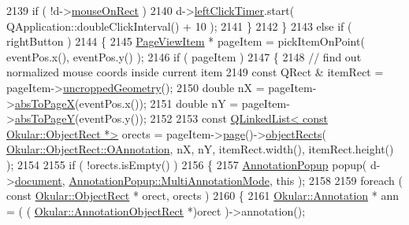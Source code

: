 \begin{DoxyCode}
2139                     \textcolor{keywordflow}{if} ( !d->\hyperlink{classPageViewPrivate_af6568bdd2ef97bb2c81a71961923ee4d}{mouseOnRect} )
2140                         d->\hyperlink{classPageViewPrivate_ac0d8482663a19cc6798a2c3b39f78d0e}{leftClickTimer}.start( QApplication::doubleClickInterval() + 10 );
2141                 \}
2142             \}
2143             \textcolor{keywordflow}{else} \textcolor{keywordflow}{if} ( rightButton )
2144             \{
2145                 \hyperlink{classPageViewItem}{PageViewItem} * pageItem = pickItemOnPoint( eventPos.x(), eventPos.y() );
2146                 \textcolor{keywordflow}{if} ( pageItem )
2147                 \{
2148                     \textcolor{comment}{// find out normalized mouse coords inside current item}
2149                     \textcolor{keyword}{const} QRect & itemRect = pageItem->\hyperlink{classPageViewItem_a5d2e73a003f65b4e95c0c21b1698f835}{uncroppedGeometry}();
2150                     \textcolor{keywordtype}{double} nX = pageItem->\hyperlink{classPageViewItem_ac8c32541cbae1efd5b4ab54f0a4b4576}{absToPageX}(eventPos.x());
2151                     \textcolor{keywordtype}{double} nY = pageItem->\hyperlink{classPageViewItem_afdbba9ce015155c0e655efbb23e5d13b}{absToPageY}(eventPos.y());
2152 
2153                     \textcolor{keyword}{const} \hyperlink{classQLinkedList}{QLinkedList< const Okular::ObjectRect *>} 
      orects = pageItem->\hyperlink{classPageViewItem_a5c512d95e5563e8d19d1fb3d93dafc31}{page}()->\hyperlink{classOkular_1_1Page_a501451ef85226267764bda58163a328a}{objectRects}( 
      \hyperlink{classOkular_1_1ObjectRect_a2f77f7653306bae90bfb68277aaafe16a7fa3680e4804e223e58ce2dea398345f}{Okular::ObjectRect::OAnnotation}, nX, nY, itemRect.width(), itemRect.height()
       );
2154 
2155                     \textcolor{keywordflow}{if} ( !orects.isEmpty() )
2156                     \{
2157                         \hyperlink{classAnnotationPopup}{AnnotationPopup} popup( d->\hyperlink{classPageViewPrivate_a50645b9853306cffd74e51efb677e5b4}{document}, 
      \hyperlink{classAnnotationPopup_af8654f3f9c2a3377f86daf329f1e0679addf6a6dddf8c14065bb700f1835dafb9}{AnnotationPopup::MultiAnnotationMode}, \textcolor{keyword}{this} );
2158 
2159                         \textcolor{keywordflow}{foreach} ( \textcolor{keyword}{const} \hyperlink{classOkular_1_1ObjectRect}{Okular::ObjectRect} * orect, orects )
2160                         \{
2161                             \hyperlink{classOkular_1_1Annotation}{Okular::Annotation} * ann = ( (
      \hyperlink{classOkular_1_1AnnotationObjectRect}{Okular::AnnotationObjectRect} *)orect )->annotation();

\end{DoxyCode}
